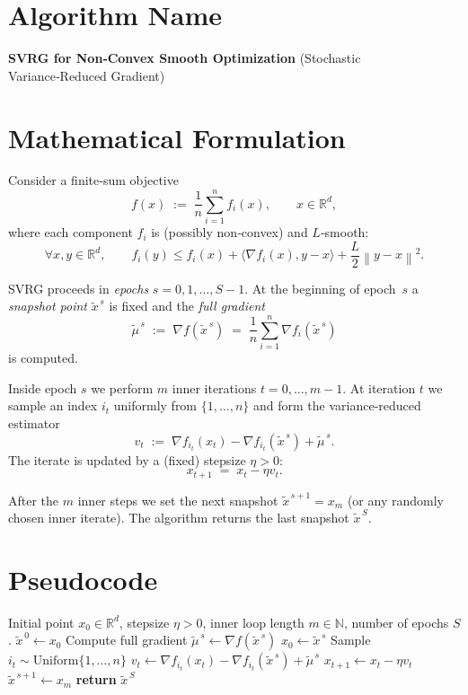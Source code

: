 \documentclass{article}
\newcommand{\RR}{\mathbb{R}}
\newcommand{\norm}[1]{\left\|#1\right\|}
\newcommand{\inner}[2]{\langle #1,#2\rangle}
\newcommand{\grad}{\nabla}
\begin{document}
\section*{Algorithm Name}
\textbf{SVRG for Non‑Convex Smooth Optimization} (Stochastic Variance‑Reduced Gradient)

\section*{Mathematical Formulation}
Consider a finite‑sum objective
\[
f(x)\;:=\;\frac{1}{n}\sum_{i=1}^{n}f_i(x),\qquad x\in\RR^{d},
\]
where each component $f_i$ is (possibly non‑convex) and $L$‑smooth:
\[
\forall x,y\in\RR^{d},\qquad
f_i(y)\le f_i(x)+\inner{\grad f_i(x)}{y-x}+\frac{L}{2}\norm{y-x}^{2}. \tag{1}
\]

SVRG proceeds in \emph{epochs} $s=0,1,\dots,S-1$.
At the beginning of epoch~$s$ a \emph{snapshot point} $\tilde{x}^{\,s}$ is fixed and the \emph{full gradient}
\[
\tilde{\mu}^{\,s}\;:=\;\grad f(\tilde{x}^{\,s})\;=\;\frac{1}{n}\sum_{i=1}^{n}\grad f_i(\tilde{x}^{\,s}) 
\tag{2}
\]
is computed.

Inside epoch $s$ we perform $m$ inner iterations $t=0,\dots,m-1$.
At iteration $t$ we sample an index $i_t$ uniformly from $\{1,\dots,n\}$ and form the variance‑reduced estimator
\[
v_t\;:=\;\grad f_{i_t}(x_t)-\grad f_{i_t}(\tilde{x}^{\,s})+\tilde{\mu}^{\,s}. \tag{3}
\]
The iterate is updated by a (fixed) stepsize $\eta>0$:
\[
x_{t+1}\;=\;x_t-\eta v_t. \tag{4}
\]

After the $m$ inner steps we set the next snapshot $\tilde{x}^{\,s+1}=x_{m}$ (or any randomly chosen inner iterate).  
The algorithm returns the last snapshot $\tilde{x}^{\,S}$.

\section*{Pseudocode}
\begin{algorithm}[H]
\caption{SVRG for Non‑Convex Smooth Optimization}
\begin{algorithmic}[1]
\Require Initial point $x_0\in\RR^{d}$, stepsize $\eta>0$, inner loop length $m\in\mathbb{N}$, number of epochs $S$.
\State $\tilde{x}^{\,0}\gets x_0$
    \State Compute full gradient $\tilde{\mu}^{\,s}\gets \grad f(\tilde{x}^{\,s})$ 
    \State $x_0 \gets \tilde{x}^{\,s}$
        \State Sample $i_t\sim\text{Uniform}\{1,\dots,n\}$
        \State $v_t\gets \grad f_{i_t}(x_t)-\grad f_{i_t}(\tilde{x}^{\,s})+\tilde{\mu}^{\,s}$
        \State $x_{t+1}\gets x_t-\eta v_t$
    \EndFor
    \State $\tilde{x}^{\,s+1}\gets x_{m}$ 
\EndFor
\State \textbf{return} $\tilde{x}^{\,S}$
\end{algorithmic}
\end{algorithm}
\end{document}
